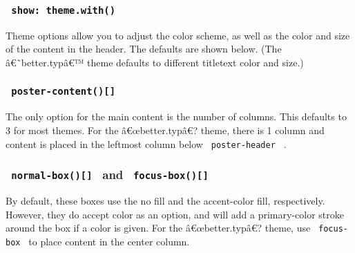 \subsubsection{\texorpdfstring{\texttt{\ show:\ theme.with()\ }}{ show: theme.with() }}\label{show-theme.with}

Theme options allow you to adjust the color scheme, as well as the color
and size of the content in the header. The defaults are shown below.
(The â€˜better.typâ€™ theme defaults to different titletext color and
size.)

\begin{Shaded}
\begin{Highlighting}[]
\NormalTok{)}
\end{Highlighting}
\end{Shaded}

\subsubsection{\texorpdfstring{\texttt{\ poster-content(){[}{]}\ }}{ poster-content(){[}{]} }}\label{poster-content}

The only option for the main content is the number of columns. This
defaults to 3 for most themes. For the â€œbetter.typâ€? theme, there is
1 column and content is placed in the leftmost column below
\texttt{\ poster-header\ } .

\begin{Shaded}
\begin{Highlighting}[]
\NormalTok{\#poster{-}content(col: 3)[}
\NormalTok{]}
\end{Highlighting}
\end{Shaded}

\subsubsection{\texorpdfstring{\texttt{\ normal-box(){[}{]}\ } and
\texttt{\ focus-box(){[}{]}\ }}{ normal-box(){[}{]}  and  focus-box(){[}{]} }}\label{normal-box-and-focus-box}

By default, these boxes use the no fill and the accent-color fill,
respectively. However, they do accept color as an option, and will add a
primary-color stroke around the box if a color is given. For the
â€œbetter.typâ€? theme, use \texttt{\ focus-box\ } to place content in
the center column.

